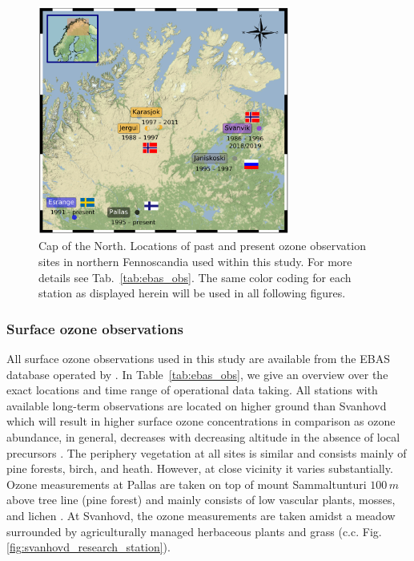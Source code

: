 \documentclass[bg, manuscript]{copernicus}
\begin{document}
\begin{figure}[t]
  \includegraphics[width=8.3cm]{fig03}
  \caption{Cap of the North. Locations of past and present ozone observation sites in northern Fennoscandia used within this study. For more details see Tab.~\ref{tab:ebas_obs}. The same color coding for each station as displayed herein will be used in all following figures.}
  \label{fig:station_map_fennoscandia}
\end{figure}

\subsubsection{Surface ozone observations}
\label{subsubsec:ebas}
All surface ozone observations used in this study are available from the EBAS database operated by \citet{NILU_EBAS}. In Table~\ref{tab:ebas_obs}, we give an overview over the exact locations and time range of operational data taking. All stations with available long-term observations are located on higher ground than Svanhovd which will result in higher surface ozone concentrations in comparison as ozone abundance, in general, decreases with decreasing altitude in the absence of local precursors \citep[e.g.,][]{AB:Klingberg2009}. The periphery vegetation at all sites is similar and consists mainly of pine forests, birch, and heath. However, at close vicinity it varies substantially. Ozone measurements at Pallas are taken on top of mount Sammaltunturi $100\,\unit{m}$ above tree line (pine forest) and mainly consists of low vascular plants, mosses, and lichen \citep{BER:Hatakka2003}. At Svanhovd, the ozone measurements are taken amidst a meadow surrounded by agriculturally managed herbaceous plants and grass (c.c. Fig.\ref{fig:svanhovd_research_station}).
\end{document}
